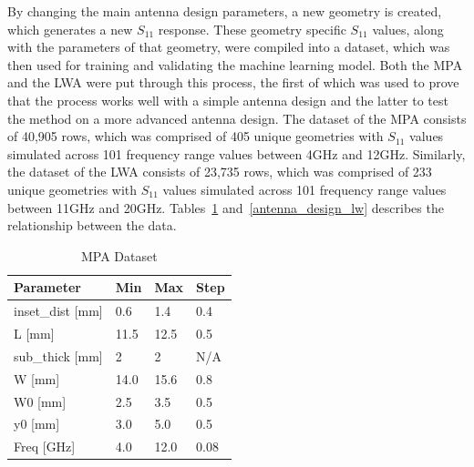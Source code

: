 \documentclass[conference]{IEEEtran}
\begin{document}
By changing the main antenna design parameters, a new geometry is created, which generates a new $S_{11}$ response. These geometry specific $S_{11}$ values, along with the parameters of that geometry, were compiled into a dataset, which was then used for training and validating the machine learning model. Both the MPA and the LWA were put through this process, the first of which was used to prove that the process works well with a simple antenna design and the latter to test the method on a more advanced antenna design. The dataset of the MPA consists of 40,905 rows, which was comprised of 405 unique geometries with $S_{11}$ values simulated across 101 frequency range values between 4GHz and 12GHz. Similarly, the dataset of the LWA consists of 23,735 rows, which was comprised of 233 unique geometries with $S_{11}$ values simulated across 101 frequency range values between 11GHz and 20GHz. Tables~\ref{antenna_dataset_p} and~\ref{antenna_design_lw} describes the relationship between the data.

\begin{table}[h]
\caption{MPA Dataset}
\begin{center}
\begin{tabular}{ |l|l|l|l| }
    \hline
    Parameter & Min & Max & Step \\ 
    \hline
    inset\_dist [mm] & 0.6 & 1.4 & 0.4 \\
    \hline
    L [mm] & 11.5 & 12.5 & 0.5 \\
    \hline
    sub\_thick [mm] & 2 & 2 & N/A \\
    \hline
    W [mm] & 14.0 & 15.6 & 0.8 \\
    \hline
    W0 [mm] & 2.5 & 3.5 & 0.5 \\
    \hline
    y0 [mm] & 3.0 & 5.0 & 0.5 \\
    \hline
    Freq [GHz] & 4.0 & 12.0 & 0.08 \\
    \hline
\end{tabular}
\end{center}
\label{antenna_dataset_p}
\end{table}
\end{document}
